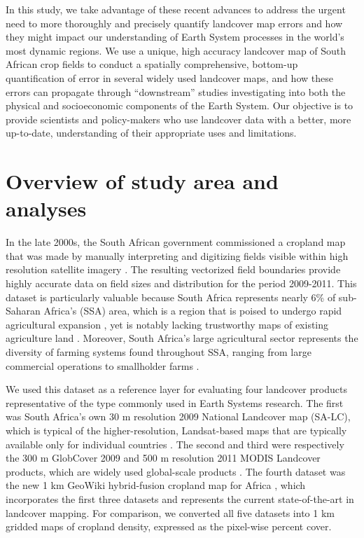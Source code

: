 \documentclass{pnastwo}
\begin{document}
\begin{article}
In this study, we take advantage of these recent advances to address the urgent need to more thoroughly and precisely quantify landcover map errors and how they might impact our understanding of Earth System processes in the world's most dynamic regions.  We use a unique, high accuracy landcover map of South African crop fields to conduct a spatially comprehensive, bottom-up quantification of error in several widely used landcover maps, and how these errors can propagate through ``downstream'' studies investigating into both the physical and socioeconomic components of the Earth System. Our objective is to provide scientists and policy-makers who use landcover data with a better, more up-to-date, understanding of their appropriate uses and limitations. 

\vspace{-0.5 cm}
\section{Overview of study area and analyses}
In the late 2000s, the South African government commissioned a cropland map that was made by manually interpreting and digitizing fields visible within high resolution satellite imagery \cite{fourie_better_2009}. The resulting vectorized field boundaries provide highly accurate data on field sizes and distribution for the period 2009-2011. This dataset is particularly valuable because South Africa represents nearly 6\% of sub-Saharan Africa's (SSA) area, which is a region that is poised to undergo rapid agricultural expansion \cite{searchinger_high_2015}, yet is notably lacking trustworthy maps of existing agriculture land \cite{fritz_comparison_2010}. Moreover, South Africa's large agricultural sector represents the diversity of farming systems found throughout SSA, ranging from large commercial operations to smallholder farms \cite{hardy_rainfed_2011,estes_using_2014}.

We used this dataset as a reference layer for evaluating four landcover products representative of the type commonly used in Earth Systems research. The first was South Africa's own 30 m resolution 2009 National Landcover map (SA-LC)\cite{sanbi_national_2009}, which is typical of the higher-resolution, Landsat-based maps that are typically available only for individual countries \cite[e.g.][]{fry_completion_2009}. The second and third were respectively the 300 m GlobCover 2009 \cite{arino_global_2012} and 500 m resolution 2011 MODIS Landcover products, which are widely used global-scale products \cite[e.g.][]{gross_monitoring_2013, shackelford_conservation_2015}. The fourth dataset was the new 1 km GeoWiki hybrid-fusion cropland map for Africa \cite{fritz_mapping_2015}, which incorporates the first three datasets and represents the current state-of-the-art in landcover mapping.  For comparison, we converted all five datasets into 1 km gridded maps of cropland density, expressed as the pixel-wise percent cover.  


\end{article}
\end{document}
